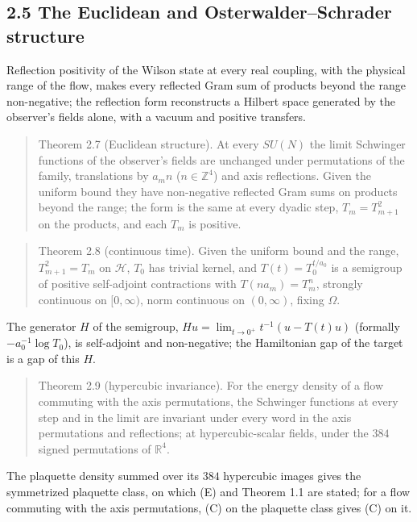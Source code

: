 \documentclass[10pt,letterpaper,twocolumn]{article}
\begin{document}
\subsection{2.5 The Euclidean and Osterwalder--Schrader structure}\label{25-the-euclidean-and-osterwalderschrader-structure}

Reflection positivity of the Wilson state at every real coupling, with the physical range of the flow, makes every reflected Gram sum of products beyond the range non-negative; the reflection form reconstructs a Hilbert space generated by the observer's fields alone, with a vacuum and positive transfers.

\begin{quote}
Theorem 2.7 (Euclidean structure). At every \(SU(N)\) the limit Schwinger functions of the observer's fields are unchanged under permutations of the family, translations by \(a_mn\) (\(n\in\mathbb Z^4\)) and axis reflections. Given the uniform bound they have non-negative reflected Gram sums on products beyond the range; the form is the same at every dyadic step, \(T_m=T_{m+1}^2\) on the products, and each \(T_m\) is positive.
\end{quote}

\begin{quote}
Theorem 2.8 (continuous time). Given the uniform bound and the range, \(T_{m+1}^2=T_m\) on \(\mathcal H\), \(T_0\) has trivial kernel, and \(T(t)=T_0^{t/a_0}\) is a semigroup of positive self-adjoint contractions with \(T(na_m)=T_m^n\), strongly continuous on \([0,\infty)\), norm continuous on \((0,\infty)\), fixing \(\Omega\).
\end{quote}

The generator \(H\) of the semigroup, \(Hu=\lim_{t\to0^+}t^{-1}(u-T(t)u)\) (formally \(-a_0^{-1}\log T_0\)), is self-adjoint and non-negative; the Hamiltonian gap of the target is a gap of this \(H\).

\begin{quote}
Theorem 2.9 (hypercubic invariance). For the energy density of a flow commuting with the axis permutations, the Schwinger functions at every step and in the limit are invariant under every word in the axis permutations and reflections; at hypercubic-scalar fields, under the \(384\) signed permutations of \(\mathbb R^4\).
\end{quote}

The plaquette density summed over its \(384\) hypercubic images gives the symmetrized plaquette class, on which (E) and Theorem 1.1 are stated; for a flow commuting with the axis permutations, (C) on the plaquette class gives (C) on it.
\end{document}
